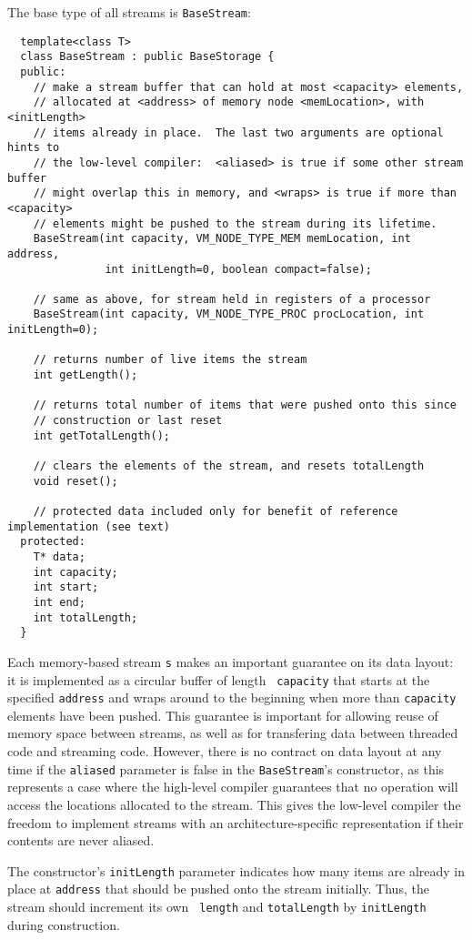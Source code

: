 The base type of all streams is {\tt BaseStream}:
{\small
\begin{verbatim}
  template<class T>
  class BaseStream : public BaseStorage {
  public:
    // make a stream buffer that can hold at most <capacity> elements,
    // allocated at <address> of memory node <memLocation>, with <initLength>
    // items already in place.  The last two arguments are optional hints to
    // the low-level compiler:  <aliased> is true if some other stream buffer 
    // might overlap this in memory, and <wraps> is true if more than <capacity>
    // elements might be pushed to the stream during its lifetime.
    BaseStream(int capacity, VM_NODE_TYPE_MEM memLocation, int address, 
               int initLength=0, boolean compact=false);

    // same as above, for stream held in registers of a processor
    BaseStream(int capacity, VM_NODE_TYPE_PROC procLocation, int initLength=0);

    // returns number of live items the stream
    int getLength();

    // returns total number of items that were pushed onto this since
    // construction or last reset
    int getTotalLength();

    // clears the elements of the stream, and resets totalLength
    void reset();

    // protected data included only for benefit of reference implementation (see text)
  protected:
    T* data;
    int capacity;
    int start;
    int end;
    int totalLength;
  }
\end{verbatim}}

Each memory-based stream {\tt s} makes an important guarantee on its
data layout: it is implemented as a circular buffer of length {\tt
capacity} that starts at the specified {\tt address} and wraps around
to the beginning when more than {\tt capacity} elements have been
pushed.  This guarantee is important for allowing reuse of memory
space between streams, as well as for transfering data between
threaded code and streaming code.  However, there is no contract on
data layout at any time if the {\tt aliased} parameter is false in the
{\tt BaseStream}'s constructor, as this represents a case where the
high-level compiler guarantees that no operation will access the
locations allocated to the stream.  This gives the low-level compiler
the freedom to implement streams with an architecture-specific
representation if their contents are never aliased.

The constructor's {\tt initLength} parameter indicates how many items
are already in place at {\tt address} that should be pushed onto the
stream initially. Thus, the stream should increment its own {\tt
length} and {\tt totalLength} by {\tt initLength} during construction.

